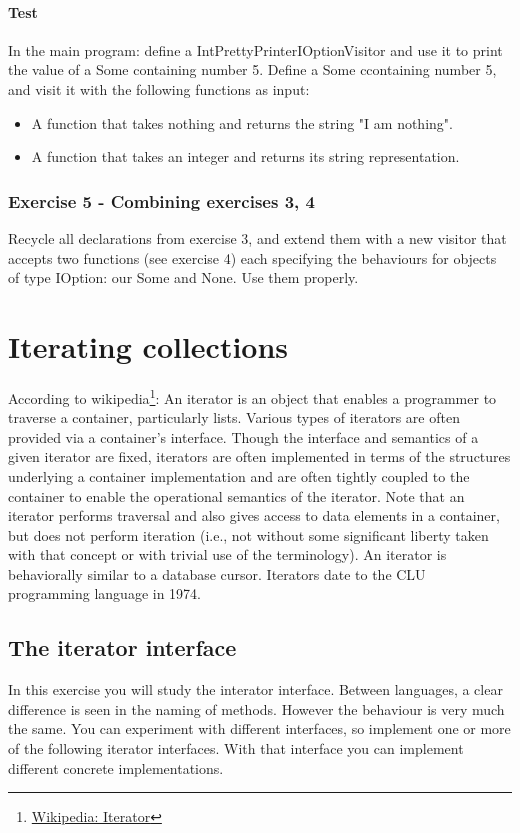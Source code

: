 \subsubsection{Test}
In the main program: define a IntPrettyPrinterIOptionVisitor and use it to print the value of a Some containing number 5.
Define a Some ccontaining number 5, and visit it with the following functions as input:
\begin{itemize}
    \item A function that takes nothing and returns the string "I am nothing".
    \item A function that takes an integer and returns its string representation.
\end{itemize}

\subsection{Exercise 5 - Combining exercises 3, 4}
Recycle all declarations from exercise 3, and extend them with a new visitor that accepts two functions (see exercise 4) each specifying the behaviours for objects of type IOption: our Some and None. Use them properly.


\chapter{Iterating collections}
According to wikipedia\footnote{\href{https://en.wikipedia.org/wiki/Iterator}{Wikipedia: Iterator}}:
An iterator is an object that enables a programmer to traverse a container, particularly lists.
Various types of iterators are often provided via a container's interface.
Though the interface and semantics of a given iterator are fixed, iterators are often implemented in terms of the structures underlying a container implementation and are often tightly coupled to the container to enable the operational semantics of the iterator.
Note that an iterator performs traversal and also gives access to data elements in a container, but does not perform iteration (i.e., not without some significant liberty taken with that concept or with trivial use of the terminology).
An iterator is behaviorally similar to a database cursor.
Iterators date to the CLU programming language in 1974.

\section{The iterator interface}
In this exercise you will study the interator interface.
Between languages, a clear difference is seen in the naming of methods.
However the behaviour is very much the same.
You can experiment with different interfaces, so implement one or more of the following iterator interfaces.
With that interface you can implement different concrete implementations.

